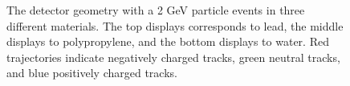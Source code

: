 \documentclass[aps,prd,twocolumn,nofootinbib]{revtex4-1}
\begin{document}
\begin{figure}
  \centering
  \hfill
  \hfill
  \hfill
  \caption{The detector geometry with a 2 GeV particle events in three different materials. The top displays corresponds to lead, the middle displays to polypropylene, and the bottom displays to water. Red trajectories indicate negatively charged tracks, green neutral tracks, and blue positively charged tracks.}
  \label{fig:mean and std of nets}
\end{figure}
\end{document}
